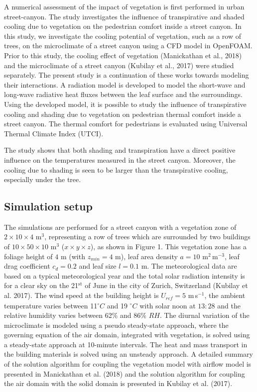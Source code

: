 A numerical assessment of the impact of vegetation is first performed in urban street-canyon. The study investigates the influence of transpirative and shaded cooling due to vegetation on the pedestrian comfort inside a street canyon. In this study, we investigate the cooling potential of vegetation, such as a row of trees, on the microclimate of a street canyon using a CFD model in OpenFOAM. Prior to this study, the cooling effect of vegetation (Manickathan et al., 2018) and the microclimate of a street canyon (Kubilay et al., 2017) were studied separately. The present study is a continuation of these works towards modeling their interactions. A radiation model is developed to model the short-wave and long-wave radiative heat fluxes between the leaf surface and the surroundings. Using the developed model, it is possible to study the influence of transpirative cooling and shading due to vegetation on pedestrian thermal comfort inside a street canyon. The thermal comfort for pedestrians is evaluated using Universal Thermal Climate Index (UTCI). 

The study shows that both shading and transpiration have a direct positive influence on the temperatures measured in the street canyon. Moreover, the cooling due to shading is seen to be larger than the transpirative cooling, especially under the tree.

\subsection{Simulation setup}

The simulations are performed for a street canyon with a vegetation zone of $2 \times 10 \times 4$ m$^3$, representing a row of trees which are surrounded by two buildings of $10 \times 50 \times 10$ m$^3$ ($x\times y \times z$), as shown in Figure 1. This vegetation zone has a foliage height of $4$ m (with $z_{\textit{min}}= 4$ m), leaf area density $a= 10$ m$^2$\,m$^{-3}$, leaf drag coefficient $c_d=0.2$ and leaf size $l=0.1$ m. The meteorological data are based on a typical meteorological year and the total solar radiation intensity is for a clear sky on the 21$^{\mathrm{st}}$ of June in the city of Zurich, Switzerland (Kubilay et al. 2017). The wind speed at the building height is $U_{\textit{ref}}=5$ m\,s$^{-1}$, the ambient temperature varies between 11$^{\circ}C$ and 19 $^{\circ}C$ with solar noon at $13:28$ and the relative humidity varies between 62\% and 86\% $RH$. The diurnal variation of the microclimate is modeled using a pseudo steady-state approach, where the governing equation of the air domain, integrated with vegetation, is solved using a steady-state approach at 10-minute intervals. The heat and mass transport in the building materials is solved using an unsteady approach. A detailed summary of the solution algorithm for coupling the vegetation model with airflow model is presented in Manickathan et al. (2018) and the solution algorithm for coupling the air domain with the solid domain is presented in Kubilay et al. (2017).

